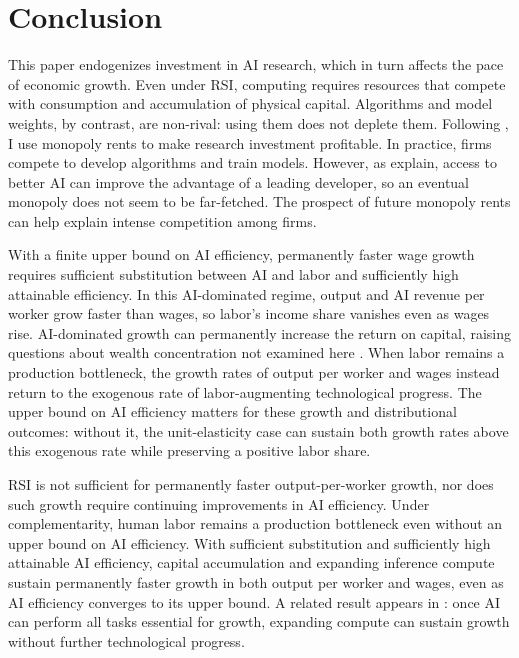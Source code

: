 \section{Conclusion}
\label{sec:rewrite-conclusion}

This paper endogenizes investment in AI research, which in turn affects the pace of economic growth. Even under RSI, computing requires resources that compete with consumption and accumulation of physical capital. Algorithms and model weights, by contrast, are non-rival: using them does not deplete them. Following \citet{romer1990}, I use monopoly rents to make research investment profitable. In practice, firms compete to develop algorithms and train models. However, as
\citet{korinekvipra2025} explain, access to better AI can improve the advantage of a leading developer, so an eventual monopoly does not seem to be far-fetched. The prospect of future monopoly rents can help explain intense competition among firms.  %

With a finite upper bound on AI efficiency, permanently faster wage growth requires sufficient substitution between AI and labor and sufficiently high attainable efficiency. In this AI-dominated regime, output and AI revenue per worker grow faster than wages, so labor's income share vanishes even as wages rise. AI-dominated growth can permanently increase the return on capital, raising questions about
wealth concentration not examined here \citep{mollrachelrestrepo2022}. When labor remains a production bottleneck, the growth rates of output per worker and wages instead return to the exogenous rate of labor-augmenting technological progress. The upper bound on AI efficiency matters for these growth and distributional outcomes: without it, the unit-elasticity case can sustain both growth rates above this exogenous rate while preserving a positive labor share.

RSI is not sufficient for permanently faster output-per-worker growth, nor does such growth require continuing improvements in AI efficiency. Under complementarity, human labor remains a production bottleneck even without an upper bound on AI efficiency. With
sufficient substitution and sufficiently high attainable AI efficiency,
capital accumulation and expanding inference compute sustain permanently
faster growth in both output per worker and wages, even as AI efficiency
converges to its upper bound.
A related result appears in \citet{restrepo2025agi}: once AI can perform
all tasks essential for growth, expanding compute can sustain growth
without further technological progress.

